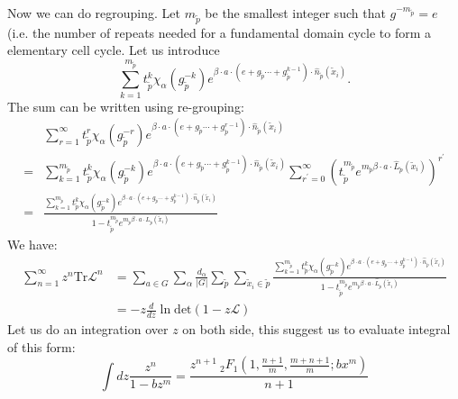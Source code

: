 \begin{description}
Now we can do regrouping. Let $m_{\tilde{p}}$ be the smallest integer
such that $g^{-m_{\tilde{p}}}=e$ (i.e. the number of repeats needed
for a fundamental domain cycle to form a elementary cell cycle. Let
us introduce
\[
\sum_{k=1}^{m_{\tilde{p}}}t_{\tilde{p}}^{k}\chi_{\alpha}(g_{\tilde{p}}^{-k})e^{\beta\cdot a\cdot(e+g_{\tilde{p}}\cdots+g_{\tilde{p}}^{k-1})\cdot\hat{n}_{\tilde{p}}(\tilde{x}_{i})}.
\]
The sum can be written using re-grouping:
\begin{align*}
 & \sum_{r=1}^{\infty}t_{\tilde{p}}^{r}\chi_{\alpha}(g_{\tilde{p}}^{-r})e^{\beta\cdot a\cdot(e+g_{\tilde{p}}\cdots+g_{\tilde{p}}^{r-1})\cdot\hat{n}_{\tilde{p}}(\tilde{x}_{i})}\\
= & \sum_{k=1}^{m_{\tilde{p}}}t_{\tilde{p}}^{k}\chi_{\alpha}(g_{\tilde{p}}^{-k})e^{\beta\cdot a\cdot(e+g_{\tilde{p}}\cdots+g_{\tilde{p}}^{k-1})\cdot\hat{n}_{\tilde{p}}(\tilde{x}_{i})}\sum_{r^{\prime}=0}^{\infty}\left(t_{\tilde{p}}^{m_{\tilde{p}}}e^{m_{\tilde{p}}\beta\cdot a\cdot\hat{L}_{\tilde{p}}(\tilde{x}_{i})}\right)^{r^{\prime}}\\
= & \frac{\sum_{k=1}^{m_{\tilde{p}}}t_{\tilde{p}}^{k}\chi_{\alpha}(g_{\tilde{p}}^{-k})e^{\beta\cdot a\cdot(e+g_{\tilde{p}}\cdots+g_{\tilde{p}}^{k-1})\cdot\hat{n}_{\tilde{p}}(\tilde{x}_{i})}}{1-t_{\tilde{p}}^{m_{\tilde{p}}}e^{m_{\tilde{p}}\beta\cdot a\cdot\hat{L}_{\tilde{p}}(\tilde{x}_{i})}}
\end{align*}
We have:
\begin{align*}
\sum_{n=1}^{\infty}z^{n}\mathrm{Tr}\mathcal{L}^{n} & =\sum_{a\in G}\sum_{\alpha}\frac{d_{\alpha}}{\vert G\vert}\sum_{\tilde{p}}\sum_{\tilde{x}_{i}\in\tilde{p}}\frac{\sum_{k=1}^{m_{\tilde{p}}}t_{\tilde{p}}^{k}\chi_{\alpha}(g_{\tilde{p}}^{-k})e^{\beta\cdot a\cdot(e+g_{\tilde{p}}\cdots+g_{\tilde{p}}^{k-1})\cdot\hat{n}_{\tilde{p}}(\tilde{x}_{i})}}{1-t_{\tilde{p}}^{m_{\tilde{p}}}e^{m_{\tilde{p}}\beta\cdot a\cdot\hat{L}_{\tilde{p}}(\tilde{x}_{i})}}\\
 & =-z\frac{d}{dz}\ln\mathrm{det}(1-z\mathcal{L})
\end{align*}
Let us do an integration over $z$ on both side, this suggest
us to evaluate integral of this form:
\[
\int dz\frac{z^{n}}{1-bz^{m}}=\frac{z^{n+1}\ _{2}F_{1}(1,\frac{n+1}{m},\frac{m+n+1}{m};bx^{m})}{n+1}
\]



\end{description}
